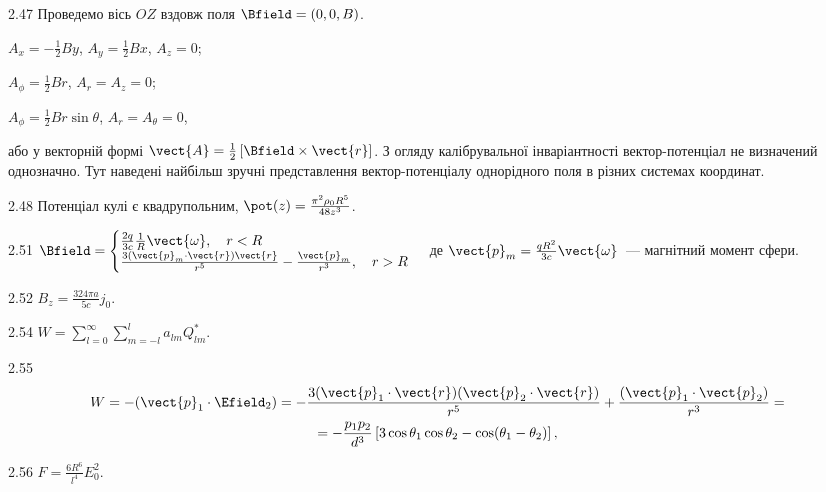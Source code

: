 \begin{Solution}{2.{47}}
	Проведемо вісь $OZ$ вздовж поля $\Bfield = (0, 0, B)$.
	\begin{enumerate*}[label=\alph*)]
		\item $A_x = -\frac12 By$, $A_y = \frac12 Bx$, $A_z = 0$;
		\item $A_{\phi} = \frac12 Br$, $A_r = A_z = 0$;
		\item $A_{\phi} = \frac12 Br\sin\theta$, $A_r = A_{\theta} = 0$,
	\end{enumerate*}
або у векторній формі 	$\vect{A} = \frac12 \left[ \Bfield\times \vect{r} \right] $.
	З огляду калібрувальної інваріантності вектор-потенціал не визначений однозначно. Тут наведені найбільш зручні представлення вектор-потенціалу однорідного поля в різних системах координат.
\end{Solution}
\begin{Solution}{2.{48}}
	Потенціал кулі є квадрупольним, $\pot(z) = \frac{\pi^2\rho_0 R^5}{48z^3}$.
\end{Solution}
\begin{Solution}{2.{51}}
	$\Bfield =
		\begin{cases}
			\frac{2q}{3c}\frac1R\vect{\omega}, \quad r < R \\
			\frac{3(\vect{p}_m \cdot \vect{r})\vect{r}}{r^5} - \frac{\vect{p}_m}{r^3}, \quad r > R
		\end{cases}
	$
	де $\vect{p}_m = \frac{qR^2}{3c}\vect{\omega}$~--- магнітний момент сфери.
\end{Solution}
\begin{Solution}{2.{52}}
	$B_z = \frac{324\pi a}{5c}j_0$.
\end{Solution}
\begin{Solution}{2.{54}}
    $W = \sum\limits_{l=0}^{\infty}\sum\limits_{m=-l}^{l}a_{lm}Q_{lm}^*$.
\end{Solution}
\begin{Solution}{2.{55}}
    \begin{multline*}
    	W = -(\vect{p}_1\cdot \Efield_2) = -\frac{3(\vect{p}_1\cdot\vect{r})(\vect{p}_2\cdot\vect{r})}{r^5}  + \frac{(\vect{p}_1\cdot\vect{p}_2)}{r^3} =\\ = -\frac{p_1p_2}{d^3}\left[ 3\cos\theta_1\cos\theta_2 - \cos(\theta_1 - \theta_2)\right] ,
    \end{multline*}
\end{Solution}
\begin{Solution}{2.{56}}
	$F = \frac{6R^6}{l^4} E_0^2$.
\end{Solution}
